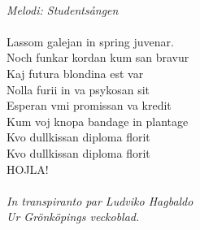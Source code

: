 \\
{\footnotesize\textit{Melodi: Studentsången}}\\
\\
Lassom galejan in spring juvenar.\\
Noch funkar kordan kum san bravur\\
Kaj futura blondina est var\\
Nolla furii in va psykosan sit\\
Esperan vmi promissan va kredit\\
Kum voj knopa bandage in plantage\\
Kvo dullkissan diploma florit\\
Kvo dullkissan diploma florit\\
HOJLA!\\
\\
{\footnotesize\textit{In transpiranto par Ludviko Hagbaldo\\ Ur
    Grönköpings veckoblad.}}
